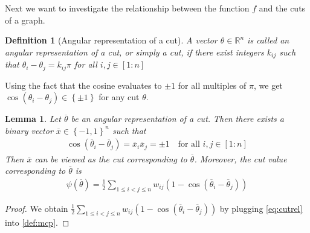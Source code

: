 \documentclass[12pt,a4paper]{article}
\theoremstyle{mythm}
\newtheorem{Def}[thm]{Definition}
\newtheorem{lem}[thm]{Lemma}
\newtheorem*{rem}{Remark}
\begin{document}
Next we want to investigate the relationship between the function $ f $ and the cuts of a graph.
\begin{Def}[Angular representation of a cut]
  A vector $ \theta \in \mathbb{R} ^{ n }  $ is called an angular representation of a cut, or simply a cut, if there exist integers $ k _{ ij }  $ such that $ \theta_i - \theta_j = k _{ ij }
\pi$ for all $ i,j \in \left[ 1:n \right]  $ 
\end{Def} 
Using the fact that the cosine evaluates to $ \pm 1 $ for all multiples of $ \pi $, we get $ \cos( \theta_i - \theta_j ) \in \left\{ \pm 1  \right\}   $ for any cut $ \theta
$.
\begin{lem}
Let $ \overline{ \theta }  $ be an angular representation of a cut. Then there exists a binary vector $ \overline{ x } \in \left\{ -1,1 \right\} ^{ n }  $  such that
\begin{align}
\label{eq:cutrel} 
\cos( \overline{ \theta } _{ i } - \overline{ \theta }  _{ j } ) = \overline{ x } _{ i } \overline{ x } _{ j } = \pm 1 \quad \text{for all } i,j \in \left[ 1:n \right] 
\end{align} 
Then $ \overline{ x }  $ can be viewed as the cut corresponding to $ \overline{ \theta }  $.
Moreover, the cut value corresponding to $ \overline{ \theta }  $ is
\begin{align}
\label{eq:psiRelaxedCut} 
\psi ( \overline{ \theta } ) = \frac{ 1 }{ 2 } \sum_{ 1 \leq i < j \leq n  }^{  } w _{ ij } \left( 1 - \cos( \overline{ \theta } _{ i } - \overline{ \theta } _{ j }  )  \right) 
\end{align} 
\end{lem} 
\begin{proof}
We obtain 
$ \frac{ 1 }{ 2 } \sum_{ 1 \leq i < j \leq n  }^{  } w _{ ij } \left( 1 - \cos( \overline{ \theta } _{ i } - \overline{ \theta } _{ j }  )  \right) $
by plugging \ref{eq:cutrel} into \ref{def:mcp}. 
\end{proof}
\end{document}
